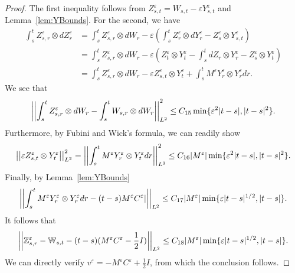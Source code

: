 \documentclass{article}
\begin{document}
\begin{proof}
The first inequality follows from $Z^\varepsilon_{s,t} = W_{s,t} - \varepsilon Y^\varepsilon_{s,t}$ and Lemma~\ref{lem:YBounds}. For the second, we have
\begin{align*}
\int_s^t Z^\varepsilon_{s,r} \otimes dZ^\varepsilon_r
&= \int_s^t Z^\varepsilon_{s,r} \otimes dW_r - \varepsilon\left( \int_s^t Z^\varepsilon_{r} \otimes dY^\varepsilon_r - Z^\varepsilon_s\otimes Y^\varepsilon_{s,t}\right) \\
&= \int_s^t Z^\varepsilon_{s,r} \otimes dW_r - \varepsilon \left( Z^\varepsilon_t\otimes Y^\varepsilon_t - \int_s^t dZ_r \otimes Y^\varepsilon_r - Z^\varepsilon_s\otimes Y^\varepsilon_t\right) \\
&= \int_s^t Z^\varepsilon_{s,r} \otimes dW_r - \varepsilon Z_{s,t}^\varepsilon\otimes Y_t^\varepsilon + \int_s^t M^\varepsilon Y^\varepsilon_r \otimes Y^\varepsilon_r dr.
\end{align*}
We see that
\[
\norm{\int_s^t Z^\varepsilon_{s,r} \otimes dW_r - \int_s^t W_{s,r} \otimes dW_r}^2_{L^2} \leq C_{15}\min\{\varepsilon^2|t-s|, |t-s|^2\}.
\]
Furthermore, by Fubini and Wick's formula, we can readily show
\[
\norm{\varepsilon Z^\varepsilon_{s,t}\otimes Y^\varepsilon_t}^2_{L^2} = \norm{\int_s^t M^\varepsilon Y^\varepsilon_{r}\otimes Y^\varepsilon_t dr}^2_{L^2} \leq C_{16}|M^\varepsilon| \min\{\varepsilon^2 |t-s|, |t-s|^2\}.
\]
Finally, by Lemma~\ref{lem:YBounds}
\[
\norm{\int_s^t M^\varepsilon Y^\varepsilon_r \otimes Y^\varepsilon_r dr - (t-s)M^\varepsilon C^\varepsilon|}_{L^2} \leq C_{17}|M^\varepsilon| \min \{\varepsilon |t-s|^{1/2}, |t-s|\}.
\]
It follows that
\[
\norm{\Z^\varepsilon_{s,r} - \W_{s,t} - (t-s)(M^\varepsilon C^\varepsilon - \frac{1}{2}I)}_{L^2} \leq C_{18}|M^\varepsilon| \min \{\varepsilon |t-s|^{1/2}, |t-s|\}.
\]
We can directly verify $v^\varepsilon = -M^\varepsilon C^\varepsilon + \frac{1}{2}I$, from which the conclusion follows.
\end{proof}
\end{document}
